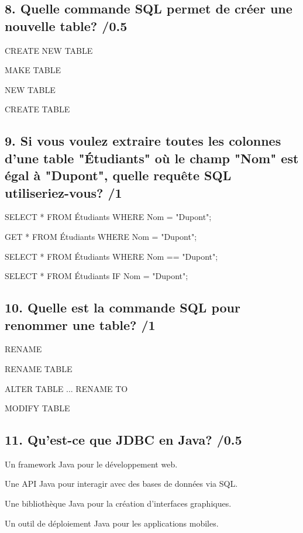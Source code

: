 \documentclass[12pt,a4paper]{article}
\begin{document}
\begin{flushleft}
\subsection*{8. Quelle commande SQL permet de créer une nouvelle table? /0.5}
\begin{choices}
    \item CREATE NEW TABLE
    \item MAKE TABLE
    \item NEW TABLE
    \item CREATE TABLE
\end{choices}

\subsection*{9. Si vous voulez extraire toutes les colonnes d'une table "Étudiants" où le champ "Nom" est égal à "Dupont", quelle requête SQL utiliseriez-vous? /1}
\begin{choices}
    \item SELECT * FROM Étudiants WHERE Nom = "Dupont";
    \item GET * FROM Étudiants WHERE Nom = "Dupont";
    \item SELECT * FROM Étudiants WHERE Nom == "Dupont";
    \item SELECT * FROM Étudiants IF Nom = "Dupont";
\end{choices}

\subsection*{10. Quelle est la commande SQL pour renommer une table? /1}
\begin{choices}
    \item RENAME
    \item RENAME TABLE
    \item ALTER TABLE ... RENAME TO
    \item MODIFY TABLE
\end{choices}

\subsection*{11. Qu'est-ce que JDBC en Java? /0.5}
\begin{choices}
    \item Un framework Java pour le développement web.
    \item Une API Java pour interagir avec des bases de données via SQL.
    \item Une bibliothèque Java pour la création d'interfaces graphiques.
    \item Un outil de déploiement Java pour les applications mobiles.
\end{choices}


\end{flushleft}
\end{document}
